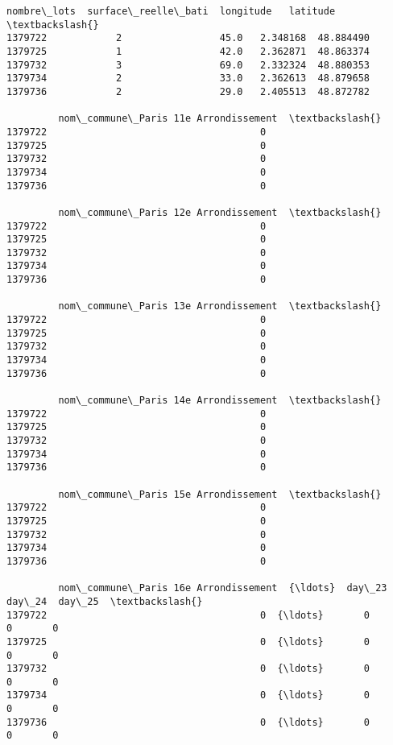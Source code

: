 \documentclass[11pt]{article}
\makeatletter
\newcommand{\boxspacing}{\kern\kvtcb@left@rule\kern\kvtcb@boxsep}
\newcommand{\prompt}[4]{
        {\ttfamily\llap{{\color{#2}[#3]:\hspace{3pt}#4}}\vspace{-\baselineskip}}
    }
\makeatother
\begin{document}
            \begin{tcolorbox}[breakable, size=fbox, boxrule=.5pt, pad at break*=1mm, opacityfill=0]
\prompt{Out}{outcolor}{62}{\boxspacing}
\begin{Verbatim}[commandchars=\\\{\}]
         nombre\_lots  surface\_reelle\_bati  longitude   latitude  \textbackslash{}
1379722            2                 45.0   2.348168  48.884490
1379725            1                 42.0   2.362871  48.863374
1379732            3                 69.0   2.332324  48.880353
1379734            2                 33.0   2.362613  48.879658
1379736            2                 29.0   2.405513  48.872782

         nom\_commune\_Paris 11e Arrondissement  \textbackslash{}
1379722                                     0
1379725                                     0
1379732                                     0
1379734                                     0
1379736                                     0

         nom\_commune\_Paris 12e Arrondissement  \textbackslash{}
1379722                                     0
1379725                                     0
1379732                                     0
1379734                                     0
1379736                                     0

         nom\_commune\_Paris 13e Arrondissement  \textbackslash{}
1379722                                     0
1379725                                     0
1379732                                     0
1379734                                     0
1379736                                     0

         nom\_commune\_Paris 14e Arrondissement  \textbackslash{}
1379722                                     0
1379725                                     0
1379732                                     0
1379734                                     0
1379736                                     0

         nom\_commune\_Paris 15e Arrondissement  \textbackslash{}
1379722                                     0
1379725                                     0
1379732                                     0
1379734                                     0
1379736                                     0

         nom\_commune\_Paris 16e Arrondissement  {\ldots}  day\_23  day\_24  day\_25  \textbackslash{}
1379722                                     0  {\ldots}       0       0       0
1379725                                     0  {\ldots}       0       0       0
1379732                                     0  {\ldots}       0       0       0
1379734                                     0  {\ldots}       0       0       0
1379736                                     0  {\ldots}       0       0       0


\end{Verbatim}
\end{tcolorbox}
\end{document}
